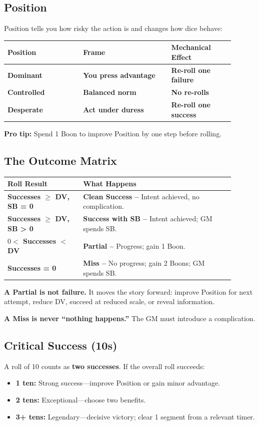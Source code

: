\documentclass[10pt,twocolumn]{article} %
\begin{document}
\subsection{Position}
Position tells you how risky the action is and changes how dice behave:
\begin{coretable}
\begin{tabular}{>{\bfseries}p{0.3\linewidth} >{\bfseries}p{0.35\linewidth} >{\bfseries}p{0.25\linewidth}}
\toprule
\textbf{Position} & \textbf{Frame} & \textbf{Mechanical Effect} \\
\midrule
Dominant & You press advantage & Re-roll one failure \\
Controlled & Balanced norm & No re-rolls \\
Desperate & Act under duress & Re-roll one success \\
\bottomrule
\end{tabular}
\end{coretable}
\textbf{Pro tip:} Spend 1 Boon to improve Position by one step before rolling.

\subsection{The Outcome Matrix}
\begin{coretable}
\begin{tabular}{>{\bfseries}p{0.3\linewidth} p{0.6\linewidth}}
\toprule
\textbf{Roll Result} & \textbf{What Happens} \\
\midrule
Successes $\ge$ DV, SB = 0 & \textbf{Clean Success --} Intent achieved, no complication. \\
Successes $\ge$ DV, SB > 0 & \textbf{Success with SB --} Intent achieved; GM spends SB. \\
$0 <$ Successes $<$ DV & \textbf{Partial --} Progress; gain 1 Boon. \\
Successes = 0 & \textbf{Miss --} No progress; gain 2 Boons; GM spends SB. \\
\bottomrule
\end{tabular}
\end{coretable}

\textbf{A Partial is not failure.} It moves the story forward: improve Position for next attempt, reduce DV, succeed at reduced scale, or reveal information.

\textbf{A Miss is never ``nothing happens.''} The GM must introduce a complication.

\subsection{Critical Success (10s)}
A roll of 10 counts as \textbf{two successes}. If the overall roll succeeds:
\begin{itemize}
    \item \textbf{1 ten:} Strong success---improve Position or gain minor advantage.
    \item \textbf{2 tens:} Exceptional---choose two benefits.
    \item \textbf{3+ tens:} Legendary---decisive victory; clear 1 segment from a relevant timer.
\end{itemize}
\end{document}
